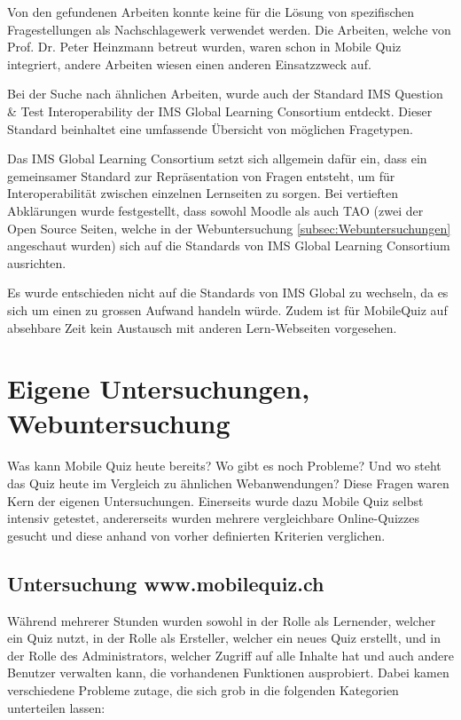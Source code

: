 Von den gefundenen Arbeiten konnte keine für die Lösung von spezifischen Fragestellungen als Nachschlagewerk verwendet werden. Die Arbeiten, welche von Prof. Dr. Peter Heinzmann betreut wurden, waren schon in Mobile Quiz integriert, andere Arbeiten wiesen einen anderen Einsatzzweck auf.

\bigskip

Bei der Suche nach ähnlichen Arbeiten, wurde auch der Standard \glqq IMS Question \& Test Interoperability\grqq \cite{imsglobal.org} der IMS Global Learning Consortium entdeckt. Dieser Standard beinhaltet eine umfassende Übersicht von möglichen Fragetypen.

Das IMS Global Learning Consortium setzt sich allgemein dafür ein, dass ein gemeinsamer Standard zur Repräsentation von Fragen entsteht, um für Interoperabilität zwischen einzelnen Lernseiten zu sorgen. Bei vertieften Abklärungen wurde festgestellt, dass sowohl Moodle \cite{moodle} als auch TAO \cite{tao} (zwei der Open Source Seiten, welche in der Webuntersuchung \ref{subsec:Webuntersuchungen} angeschaut wurden) sich auf die Standards von IMS Global Learning Consortium ausrichten.

Es wurde entschieden nicht auf die Standards von IMS Global zu wechseln, da es sich um einen zu grossen Aufwand handeln würde. Zudem ist für MobileQuiz auf absehbare Zeit kein Austausch mit anderen Lern-Webseiten vorgesehen.


\section{Eigene Untersuchungen, Webuntersuchung}
\label{sec:eigeneUntersuchungenWebuntersuchungen}

Was kann Mobile Quiz heute bereits? Wo gibt es noch Probleme? Und wo steht das Quiz heute im Vergleich zu ähnlichen Webanwendungen? Diese Fragen waren Kern der eigenen Untersuchungen. Einerseits wurde dazu Mobile Quiz selbst intensiv getestet, andererseits wurden mehrere vergleichbare Online-Quizzes gesucht und diese anhand von vorher definierten Kriterien verglichen.


	\subsection{Untersuchung www.mobilequiz.ch}
	\label{subsec:eigeneUntersuchungen}
	Während mehrerer Stunden wurden sowohl in der Rolle als Lernender, welcher ein Quiz nutzt, in der Rolle als Ersteller, welcher ein neues Quiz erstellt, und in der Rolle des Administrators, welcher Zugriff auf alle Inhalte hat und auch andere Benutzer verwalten kann, die vorhandenen Funktionen ausprobiert. Dabei kamen verschiedene Probleme zutage, die sich grob in die folgenden Kategorien unterteilen lassen:
	
